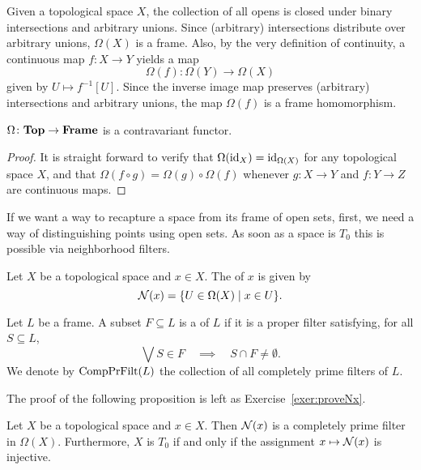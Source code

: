 \begin{example}\label{exa:frame-of-opens}
Given a topological space $X$, the collection of all opens is closed under binary intersections and arbitrary  unions. Since (arbitrary) intersections distribute over arbitrary unions, $\Omega(X)$ is a frame. Also, by the very definition of continuity, a continuous map $f\colon X\to Y$ yields a map
\[
\Omega(f)\colon\Omega(Y)\to \Omega(X)
\]
 given by $U\mapsto f^{-1}[U]$. Since the inverse image map preserves (arbitrary) intersections and arbitrary unions, the map $\Omega(f)$ is a frame homomorphism.
\end{example}

\begin{proposition}
$\Omega\colon\mathbf{Top}\to\mathbf{Frame}$ is a contravariant functor.
\end{proposition}

\begin{proof}
It is straight forward to verify that $\Omega(\mathrm{id}_X)=\mathrm{id}_{\Omega(X)}$ for any topological space $X$, and that $\Omega(f\circ g)=\Omega(g)\circ\Omega(f)$ whenever $g\colon X\to Y$ and $f\colon Y\to Z$ are continuous maps.
\end{proof}

If we want a way to recapture a space from its frame of open sets, first, we need a way of distinguishing points using open sets. As soon as a space is $T_0$ this is possible via neighborhood filters.

\begin{definition}\label{def:neighborhood-filter}
Let $X$ be a topological space and $x\in X$. The  of $x$ is given by
\[
\mathcal{N}(x)=\{ U\in\Omega(X)\mid x\in U\}.
\]
\end{definition}

\begin{definition}\label{def:compl-prime-filter}
Let $L$ be a frame. A subset $F\subseteq L$ is a  of $L$ if it is a proper filter satisfying, for all $S\subseteq L$,
\[
\bigvee S\in F \quad\implies\quad S\cap F\neq\emptyset.
\]
We denote by $\mathrm{CompPrFilt}(L)$ the collection of all completely prime filters of $L$.
\end{definition}

The proof of the following proposition is left as Exercise~\ref{exer:proveNx}.

\begin{proposition}\label{prop:Nx}
Let $X$ be a topological space and $x\in X$. Then $\mathcal{N}(x)$ is a completely prime filter in $\Omega(X)$.  
Furthermore, $X$ is $T_0$ if and only if the assignment $x\mapsto\mathcal{N}(x)$ is injective.
\end{proposition}



